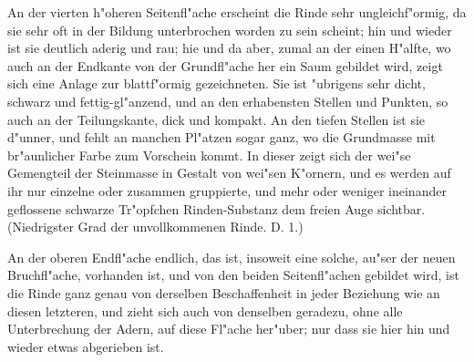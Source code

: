 \documentclass[a4paper, 11pt, oneside, german]{article}
\begin{document}
An der vierten h"oheren Seitenfl"ache erscheint die Rinde sehr ungleichf"ormig, da sie sehr oft in der Bildung unterbrochen worden zu sein scheint; hin und wieder ist sie deutlich aderig und rau; hie und da aber, zumal an der einen H"alfte, wo auch an der Endkante von der Grundfl"ache her ein Saum gebildet wird, zeigt sich eine Anlage zur blattf"ormig gezeichneten. Sie ist "ubrigens sehr dicht, schwarz und fettig-gl"anzend, und an den erhabensten Stellen und Punkten, so auch an der Teilungskante, dick und kompakt. An den tiefen Stellen ist sie d"unner, und fehlt an manchen Pl"atzen sogar ganz, wo die Grundmasse mit br"aunlicher Farbe zum Vorschein kommt. In dieser zeigt sich der wei"se Gemengteil der Steinmasse in Gestalt von wei"sen K"ornern, und es werden auf ihr nur einzelne oder zusammen gruppierte, und mehr oder weniger ineinander geflossene schwarze Tr"opfchen Rinden-Substanz dem freien Auge sichtbar. (Niedrigster Grad der unvollkommenen Rinde. D. 1.)

An der oberen Endfl"ache endlich, das ist, insoweit eine solche, au"ser der neuen Bruchfl"ache, vorhanden ist, und von den beiden Seitenfl"achen gebildet wird, ist die Rinde ganz genau von derselben Beschaffenheit in jeder Beziehung wie an diesen letzteren, und zieht sich auch von denselben geradezu, ohne alle Unterbrechung der Adern, auf diese Fl"ache her"uber; nur dass sie hier hin und wieder etwas abgerieben ist.
\end{document}
